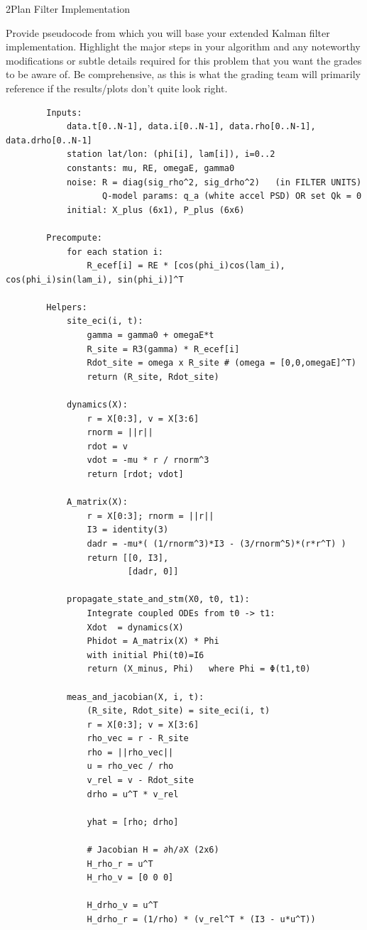 \begin{hwkProblem}{2}{Plan Filter Implementation} \label{hwk:p02}

	Provide pseudocode from which you will base your extended Kalman filter implementation. Highlight the major steps in your algorithm and any noteworthy modifications or subtle details required for this problem that you want the grades to be aware of. Be comprehensive, as this is what the grading team will primarily reference if the results/plots don't quite look right.

	\hwkSol{} \label{hwk:s02}

	\begin{verbatim}
		Inputs:
			data.t[0..N-1], data.i[0..N-1], data.rho[0..N-1], data.drho[0..N-1]
			station lat/lon: (phi[i], lam[i]), i=0..2
			constants: mu, RE, omegaE, gamma0
			noise: R = diag(sig_rho^2, sig_drho^2)   (in FILTER UNITS)
			       Q-model params: q_a (white accel PSD) OR set Qk = 0
			initial: X_plus (6x1), P_plus (6x6)

		Precompute:
			for each station i:
				R_ecef[i] = RE * [cos(phi_i)cos(lam_i), cos(phi_i)sin(lam_i), sin(phi_i)]^T

		Helpers:
			site_eci(i, t):
				gamma = gamma0 + omegaE*t
				R_site = R3(gamma) * R_ecef[i]
				Rdot_site = omega x R_site # (omega = [0,0,omegaE]^T)
				return (R_site, Rdot_site)

			dynamics(X):
				r = X[0:3], v = X[3:6]
				rnorm = ||r||
				rdot = v
				vdot = -mu * r / rnorm^3
				return [rdot; vdot]

			A_matrix(X):
				r = X[0:3]; rnorm = ||r||
				I3 = identity(3)
				dadr = -mu*( (1/rnorm^3)*I3 - (3/rnorm^5)*(r*r^T) )
				return [[0, I3],
				        [dadr, 0]]

			propagate_state_and_stm(X0, t0, t1):
				Integrate coupled ODEs from t0 -> t1:
				Xdot  = dynamics(X)
				Phidot = A_matrix(X) * Phi
				with initial Phi(t0)=I6
				return (X_minus, Phi)   where Phi = Φ(t1,t0)

			meas_and_jacobian(X, i, t):
				(R_site, Rdot_site) = site_eci(i, t)
				r = X[0:3]; v = X[3:6]
				rho_vec = r - R_site
				rho = ||rho_vec||
				u = rho_vec / rho
				v_rel = v - Rdot_site
				drho = u^T * v_rel

				yhat = [rho; drho]

				# Jacobian H = ∂h/∂X (2x6)
				H_rho_r = u^T
				H_rho_v = [0 0 0]

				H_drho_v = u^T
				H_drho_r = (1/rho) * (v_rel^T * (I3 - u*u^T))


\end{verbatim}
\end{hwkProblem}
